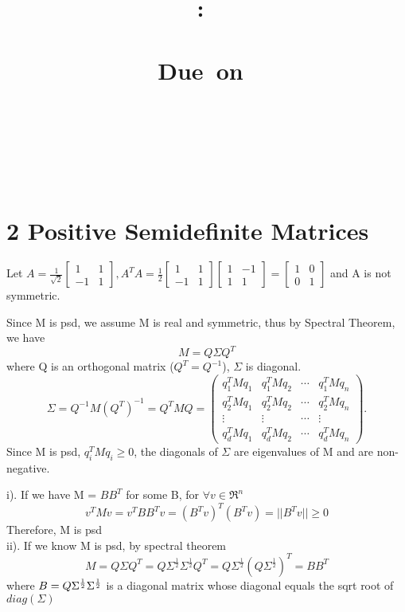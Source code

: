 \documentclass{article}
\title{
    \vspace{2in}
    \textmd{\textbf{\hmwkClass:\ \hmwkTitle \\ \hmwksubtitle }}\\
    \vspace{1in}
    \normalsize\vspace{0.1in}\small{Due\ on\ \hmwkDueDate}\\
    \vspace{0.1in}\large{\textit{\hmwkClassInstructor}}\\
    \vspace{3in}
    \author{\textbf{\hmwkAuthorName} \\ \textbf{\hmwknetid }\\ }
    \vspace{0.2in}
    \gihub
}
\date{}
\newenvironment{sub}[2][$-$]{\begin{trivlist}
		\item[\hskip \labelsep {\bfseries #1}\hskip \labelsep {\bfseries #2.}]}  {\end{trivlist}}
\begin{document}
\maketitle

\pagebreak

\section{2 Positive Semidefinite Matrices}

\begin{sub}{2.1}
\end{sub}
Let $A = \frac{1}{\sqrt{2}} \begin{bmatrix} 1 & 1\\ -1&1 \end{bmatrix} ,
 A^TA = \frac{1}{2} \begin{bmatrix} 1 & 1\\ -1&1 \end{bmatrix} \begin{bmatrix} 1 & -1\\ 1& 1 \end{bmatrix}  = \begin{bmatrix} 1 & 0\\ 0&1 \end{bmatrix}  $ and A is not symmetric.\\
 
 \begin{sub}{2.2}
 \end{sub}
 Since M is psd, we assume M is real and symmetric, thus by Spectral Theorem, we have $$M = Q\Sigma Q^T$$ where Q is an orthogonal matrix ($Q^T = Q^{-1}$), $\Sigma$ is diagonal. 
 $$\Sigma  = Q^{-1} M(Q^{T})^{-1} = Q^TMQ = 
 \begin{pmatrix}q_{1}^{T}Mq_{1} & q_{1}^{T}Mq_{2} & \cdots & q_{1}^{T}Mq_{n}\\
 q_{2}^{T}Mq_{1} & q_{2}^{T}Mq_{2} & \cdots & q_{2}^{T}Mq_{n}\\
 \vdots & \vdots & \cdots & \vdots\\
 q_{d}^{T}Mq_{1} & q_{d}^{T}Mq_{2} & \cdots & q_{d}^{T}Mq_{n}
 \end{pmatrix}.
 $$
 Since M is psd, $q_i^TMq_i \geq 0$, the diagonals of $\Sigma$ are eigenvalues of M and are non-negative. 
 
 \begin{sub}{2.3}
 \end{sub}
 i). If we have  M = $BB^T$ for some B, for $\forall  v \in \Re^n$
 $$v^TMv = v^TBB^Tv = (B^Tv)^T(B^Tv) = ||B^Tv|| \geq 0$$ Therefore, M is psd\\
 ii). If we know M is psd, by spectral theorem
 $$M =  Q\Sigma Q^T = Q\Sigma^{\frac{1}{2}} \Sigma^{\frac{1}{2}} Q^T = Q\Sigma^{\frac{1}{2}}(Q\Sigma^{\frac{1}{2}})^{T} = BB^T$$
 where $B =Q\Sigma^{\frac{1}{2}}\\ \Sigma^{\frac{1}{2}}$ is a diagonal matrix whose diagonal equals the sqrt root of $diag(\Sigma)$\\
 
\end{document}
